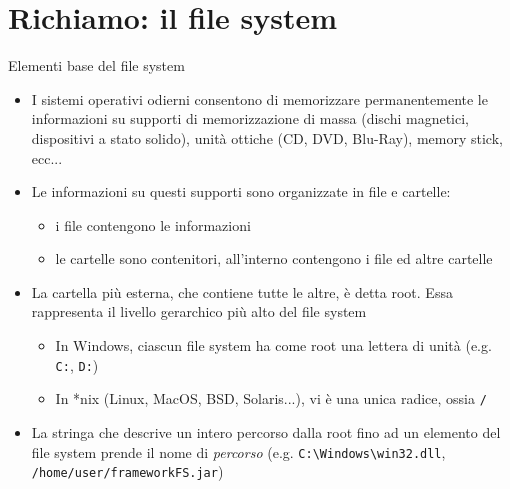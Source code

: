 \documentclass[presentation]{beamer}
\begin{document}
\section{Richiamo: il file system}
\begin{frame}{Elementi base del file system}
  \begin{itemize}
    \item I sistemi operativi odierni consentono di memorizzare permanentemente le informazioni su supporti di memorizzazione di massa (dischi magnetici, dispositivi a stato solido), unità ottiche (CD, DVD, Blu-Ray), memory stick, ecc...
    \item Le informazioni su questi supporti sono organizzate in file e cartelle:
      \begin{itemize}
        \item i file contengono le informazioni
        \item le cartelle sono contenitori, all'interno contengono i file ed altre cartelle
      \end{itemize}
    \item La cartella più esterna, che contiene tutte le altre, è detta root. Essa rappresenta il livello gerarchico più alto del file system
      \begin{itemize}
        \item In Windows, ciascun file system ha come root una lettera di unità (e.g. \texttt{C:}, \texttt{D:})
        \item In *nix (Linux, MacOS, BSD, Solaris...), vi è una unica radice, ossia \texttt{/}
      \end{itemize}
    \item La stringa che descrive un intero percorso dalla root fino ad un elemento del file system prende il nome di \emph{percorso} (e.g. \texttt{C:\textbackslash{}Windows\textbackslash{}win32.dll}, \texttt{/home/user/frameworkFS.jar})
  \end{itemize}
\end{frame}
\end{document}

